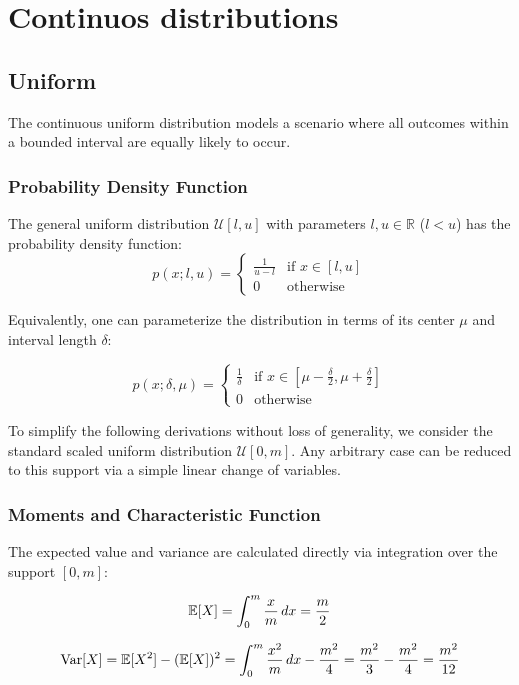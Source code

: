 \clearpage
\section{Continuos distributions}
\subsection{Uniform}
\label{sec:uniform}

The continuous uniform distribution models a scenario where all outcomes within a bounded interval are equally likely to occur. 

\subsubsection{Probability Density Function}
The general uniform distribution $\mathcal{U}[l, u]$ with parameters $l, u \in \mathbb{R}$ ($l < u$) has the probability density function:
\begin{equation}
	p(x; l, u)=
	\begin{cases}
		\frac{1}{u-l} & \text{if } x \in [l, u] \\
		0 & \text{otherwise}
	\end{cases}
	\label{pmf:uniform_general}
\end{equation}

Equivalently, one can parameterize the distribution in terms of its center $\mu$ and interval length $\delta$:

	\[
	p(x; \delta, \mu)=
	\begin{cases}
		\frac{1}{\delta} & \text{if } x \in \left[\mu-\frac{\delta}{2}, \mu+\frac{\delta}{2}\right] \\
		0 & \text{otherwise}
	\end{cases}
	\]
	
To simplify the following derivations without loss of generality, we consider the standard scaled uniform distribution $\mathcal{U}[0, m]$. Any arbitrary case can be reduced to this support via a simple linear change of variables.

\subsubsection{Moments and Characteristic Function}
The expected value and variance are calculated directly via integration over the support $[0, m]$:

	\[
	\mathbb{E}[X] = \int_{0}^{m} \frac{x}{m}\,dx = \frac{m}{2}
	\]

	\[
	\operatorname{Var}[X] = \mathbb{E}[X^2] - (\mathbb{E}[X])^2 = \int_{0}^{m} \frac{x^2}{m}\,dx - \frac{m^2}{4} = \frac{m^2}{3} - \frac{m^2}{4} = \frac{m^2}{12}
	\]

